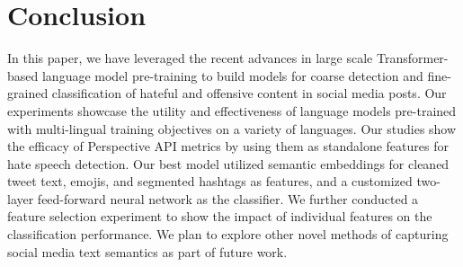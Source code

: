 \documentclass[
]{ceurart}
\begin{document}
\section{Conclusion}
In this paper, we have leveraged the recent advances in large scale Transformer-based language model pre-training to build models for coarse detection and fine-grained classification of hateful and offensive content in social media posts. Our experiments showcase the utility and effectiveness of language models pre-trained with multi-lingual training objectives on a variety of languages. Our studies show the efficacy of Perspective API metrics by using them as standalone features for hate speech detection. Our best model utilized semantic embeddings for cleaned tweet text, emojis, and segmented hashtags as features, and a customized two-layer feed-forward neural network as the classifier. We further conducted a feature selection experiment to show the impact of individual features on the classification performance. We plan to explore other novel methods of capturing social media text semantics as part of future work.


\end{document}
